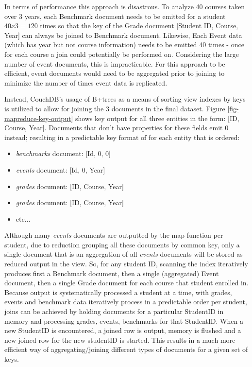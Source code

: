 In terms of performance this approach is disastrous. To analyze 40 courses taken over 3 years, each Benchmark document needs to be emitted for a student $40 x 3 = 120$ times so that the key of the Grade document [Student ID, Course, Year] can always be joined to Benchmark document. Likewise, Each Event data (which has year but not course information) needs to be emitted 40 times - once for each course a join could potentially be performed on. Considering the large number of event documents, this is impracticable. For this approach to be efficient, event documents would need to be aggregated prior to joining to minimize the number of times event data is replicated.

Instead, CouchDB's usage of B+trees as a means of sorting view indexes by keys is utilized to allow for joining the 3 documents in the final dataset. Figure \ref{fig-mapreduce-key-output} shows key output for all three entities in the form: [ID, Course, Year]. Documents that don't have properties for these fields emit 0 instead; resulting in a predictable key format of for each entity that is ordered:

\begin{itemize}
    \item \textit{benchmarks} document: [Id, 0, 0]
    \item \textit{events} document: [Id, 0, Year]
    \item \textit{grades} document: [ID, Course, Year]
    \item \textit{grades} document: [ID, Course, Year]
    \item etc...
\end{itemize}

Although many \textit{events} documents are outputted by the map function per student, due to reduction grouping all these documents by common key, only a single document that is an aggregation of all \textit{events} documents will be stored as reduced output in the view. So, for any student ID, scanning the index iteratively produces first a Benchmark document, then a single (aggregated) Event document, then a single Grade document for each course that student enrolled in. Because output is systematically processed a student at a time, with grades, events and benchmark data iteratively process in a predictable order per student, joins can be achieved by holding documents for a particular StudentID in memory and processing grades, events, benchmarks for that StudentID. When a new StudentID is encountered, a joined row is output, memory is flushed and a new joined row for the new studentID is started. This results in a much more efficient way of aggregating/joining different types of documents for a given set of keys.

